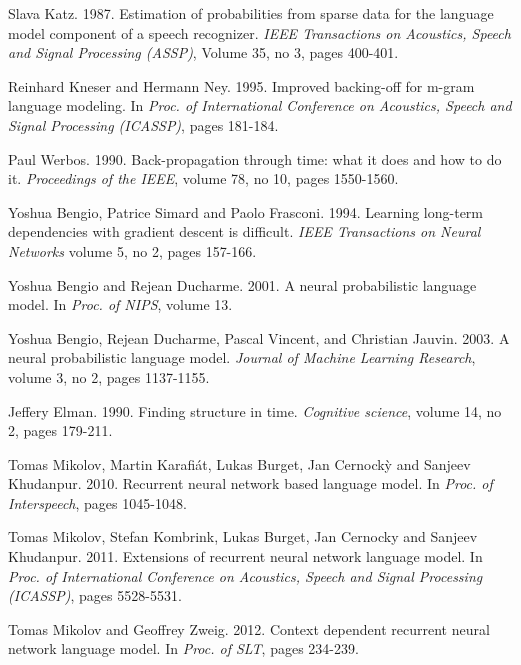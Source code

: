\documentclass[11pt]{article}
\begin{document}
\begin{thebibliography}{}

 Slava Katz. 1987.  Estimation of probabilities from sparse data for the language model component of a speech recognizer. {\em IEEE Transactions on Acoustics, Speech and Signal Processing (ASSP)}, Volume 35, no 3, pages 400-401.

 Reinhard Kneser and Hermann Ney. 1995. Improved backing-off for m-gram language modeling. In {\em Proc. of International Conference on Acoustics, Speech and Signal Processing (ICASSP)}, pages 181-184.

 Paul Werbos. 1990. Back-propagation through time: what it does and how to do it. {\em Proceedings of the IEEE}, volume 78, no 10, pages 1550-1560.

 Yoshua Bengio, Patrice Simard and Paolo Frasconi. 1994. Learning long-term dependencies with gradient descent is difficult. {\em IEEE Transactions on Neural Networks} volume 5, no 2, pages 157-166.

 Yoshua Bengio and Rejean Ducharme. 2001. A neural probabilistic language model. In {\em Proc. of NIPS}, volume 13.

  Yoshua Bengio, Rejean Ducharme, Pascal Vincent, and Christian Jauvin. 2003. A neural probabilistic language model.  {\em Journal of Machine Learning Research}, volume 3, no 2, pages 1137-1155.

 Jeffery Elman. 1990. Finding structure in time. {\em Cognitive science}, volume 14, no 2, pages 179-211.

  Tomas Mikolov, Martin Karafi{\'a}t, Lukas Burget, Jan Cernock{\`y} and Sanjeev Khudanpur. 2010. Recurrent neural network based language model. In {\em Proc. of Interspeech}, pages 1045-1048.

 Tomas Mikolov, Stefan Kombrink, Lukas Burget, Jan Cernocky and Sanjeev Khudanpur. 2011. Extensions of recurrent neural network language model. In {\em Proc. of International Conference on Acoustics, Speech and Signal Processing (ICASSP)}, pages 5528-5531.

  Tomas Mikolov and Geoffrey Zweig. 2012. Context dependent recurrent neural network language model. In {\em Proc. of SLT}, pages 234-239.


\end{thebibliography}
\end{document}
